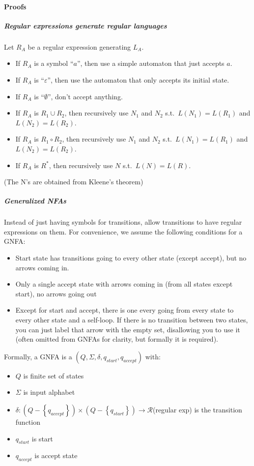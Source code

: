 \documentclass[12 pt]{article}
\begin{document}
\paragraph{Proofs}
\subparagraph{Regular expressions generate regular languages}
Let $R_A$ be a regular expression generating $L_A$.
\begin{itemize}
\item
If $R_A$ is a symbol ``$a$'', then use a simple automaton that just
accepts $a$.
\item
If $R_A$ is ``$\varepsilon$'', then use the automaton that only accepts
its initial state.
\item
  If $R_A$ is ``$\emptyset$'', don't accept anything.
\item If $R_A$ is $R_1 \cup R_2$, then recursively use $N_1$ and $N_2$
  s.t.\ $L(N_1) = L(R_1)$ and $L(N_2) = L(R_2)$.
\item If $R_A$ is $R_1 \circ R_2$, then recursively use $N_1$ and $N_2$
  s.t.\ $L(N_1) = L(R_1)$ and $L(N_2) = L(R_2)$.
\item If $R_A$ is $R^*$, then recursively use $N$
  s.t.\ $L(N) = L(R)$.
\end{itemize}
(The N's are obtained from Kleene's theorem)
\subparagraph{Generalized NFAs}
Instead of just having symbols for transitions, allow transitions to
have regular expressions on them. For convenience, we assume the
following conditions for a GNFA:
\begin{itemize}
\item Start state has transitions going to every other state (except accept), but no arrows
  coming in.
\item Only a single accept state with arrows coming in (from all
  states except start), no arrows going out
\item Except for start and accept, there is one every going from every
  state to every other state and a self-loop. If there is no
  transition between two states, you can just label that arrow with
  the empty set, disallowing you to use it (often omitted from GNFAs
  for clarity, but formally it is required).
\end{itemize}
Formally, a GNFA is a $(Q, \Sigma, \delta, q_{start}, q_{accept})$
with:
\begin{itemize}
\item $Q$ is finite set of states
\item $\Sigma$ is input alphabet
\item $\delta: (Q - \left\{q_{accept}\right\}) \times (Q -
  \left\{q_{start}\right\}) \to \mathcal{R}$(regular exp) is the transition
  function
\item $q_{start}$ is start
\item $q_{accept}$ is accept state
\end{itemize}
\end{document}
